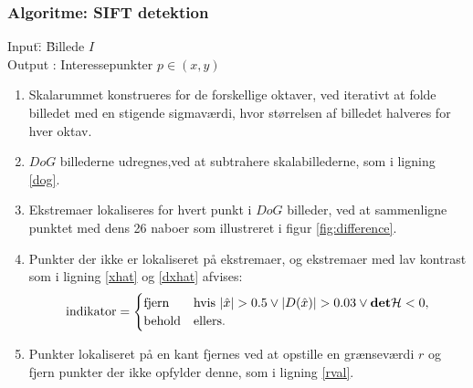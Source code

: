 \subsubsection*{Algoritme: SIFT detektion}
\begin{tabbing}
Input\quad \= : \= Billede $I$\\
Output \text{ } \> : \> Interessepunkter $p \in (x,y)$
\end{tabbing}
\begin{enumerate}
\item{Skalarummet konstrueres for de forskellige oktaver, ved iterativt at folde billedet med en stigende sigmaværdi, hvor størrelsen af billedet halveres for hver oktav.}
\item{$DoG$ billederne udregnes,ved at subtrahere skalabillederne, som i ligning \eqref{dog}.}
\item{Ekstremaer lokaliseres for hvert punkt i $DoG$ billeder, ved at sammenligne punktet med dens 26 naboer som illustreret i figur \ref{fig:difference}.}
\item{Punkter der ikke er lokaliseret på ekstremaer, og ekstremaer med lav kontrast som i ligning \eqref{xhat} og \eqref{dxhat} afvises:
\begin{equation}
\begin{split}
\text{indikator} = 
\begin{cases}
\text{fjern}& \text{hvis } |\hat{x}|>0.5 \lor |D(\hat{x})|>0.03 \lor \bold{det} \mathcal{H}<0 , \\
\text{behold}& \text{ellers}. 
\end{cases}
\end{split}
\label{maxsurp}
\end{equation}
}
\item{Punkter lokaliseret på en kant fjernes ved at opstille en grænseværdi $r$ og fjern punkter der ikke opfylder denne, som i ligning \eqref{rval}.}
\end{enumerate}
